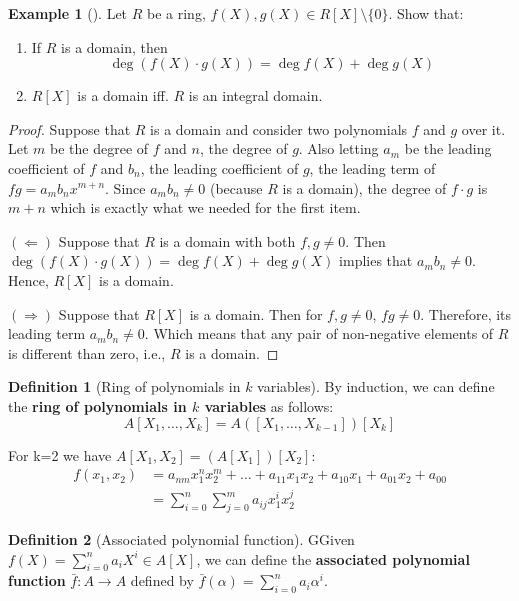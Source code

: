\documentclass[12pt,a4paper]{article}
\theoremstyle{definition}
\newtheorem{example}{Example}[section]
\newtheorem{definition}{Definition}[section]
\begin{document}
\begin{example}[]
Let $R$ be a ring, $f(X), g(X) \in R[X] \setminus \{ 0 \}$. Show that:
\begin{enumerate}
\item If $R$ is a domain, then 
\[
\deg(f(X) \cdot g(X)) = \deg f(X) + \deg g(X)
\]
\item $R[X]$ is a domain iff. $R$ is an integral domain.
\end{enumerate}
\end{example}

\begin{proof}
Suppose that $R$ is a domain and consider two polynomials $f$ and $g$ over it. Let $m$ be the degree of $f$ and $n$, the degree of $g$. Also letting $a_m$ be the leading coefficient of $f$ and $b_n$, the leading coefficient of $g$, the leading term of $fg = a_m b_n x^{m+n}$. Since $a_m b_n \neq 0$ (because $R$ is a domain), the degree of $f \cdot g$ is $m+n$ which is exactly what we needed for the first item.

$(\Leftarrow)$ Suppose that $R$ is a domain with both $f, g \neq 0$. Then $\deg(f(X) \cdot g(X)) = \deg f(X) + \deg g(X)$ implies that $a_m b_n \neq 0$. Hence, $R[X]$ is a domain.

$(\Rightarrow)$ Suppose that $R[X]$ is a domain. Then for $f, g \neq 0$, $fg \neq 0$. Therefore, its leading term $a_m b_n \neq 0$. Which means that any pair of non-negative elements of $R$ is different than zero, i.e., $R$ is a domain.
\end{proof}

\begin{definition}[Ring of polynomials in $k$ variables]
By induction, we can define the \textbf{ring of polynomials in $k$ variables} as follows:
\[
A[X_1,\ldots,X_k] = A([X_1,\ldots,X_{k-1}])[X_k]
\]
\end{definition}

For k=2 we have $A[X_1,X_2] = (A[X_1])[X_2]$:
\begin{equation*}
\begin{aligned}
f(x_1,x_2) & = a_{nm}x_1^{n} x_2^{m} + \ldots + a_{11}x_1 x_2 + a_{10}x_1 + a_{01}x_2 + a_{00} \\
& = \sum_{i=0}^n \sum_{j=0}^m a_{ij} x_1^i x_2^j
\end{aligned}
\end{equation*}

\begin{definition}[Associated polynomial function]
GGiven $f(X) = \sum_{i=0}^n  a_i X^i \in A[X]$, we can define the \textbf{associated polynomial function} $\bar{f} : A \to A$ defined by $\bar{f}(\alpha) = \sum_{i=0}^n a_i \alpha^i$.
\end{definition}
\end{document}
